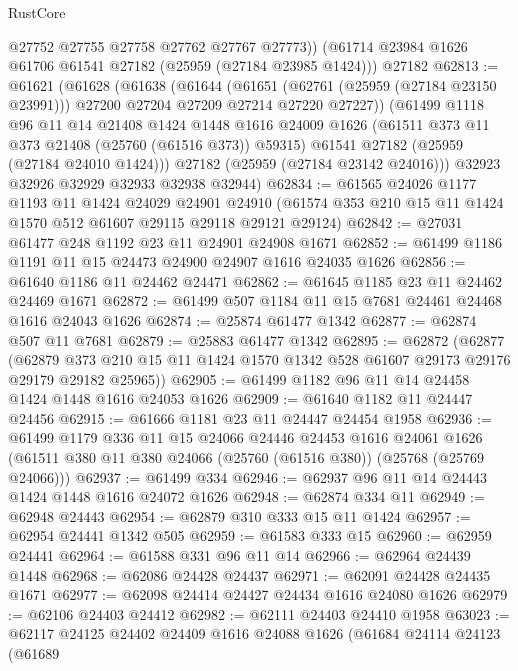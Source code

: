 \begin{lexlean}{RustCore}
\begin{coremodule}
        @27752
        @27755
        @27758
        @27762
        @27767
        @27773))
    (@61714 @23984 @1626 @61706 @61541 @27182 (@25959 (@27184 @23985 @1424)))
    @27182
@62813 := @61621
    (@61628
      (@61638
        (@61644
          (@61651
            (@62761 (@25959 (@27184 @23150 @23991)))
            @27200
            @27204
            @27209
            @27214
            @27220
            @27227))
        (@61499
          @1118
          @96
          @11
          @14
          @21408
          @1424
          @1448
          @1616
          @24009
          @1626
          (@61511 @373 @11 @373 @21408 (@25760 (@61516 @373)) @59315)
          @61541
          @27182
          (@25959 (@27184 @24010 @1424)))
        @27182
        (@25959 (@27184 @23142 @24016)))
      @32923
      @32926
      @32929
      @32933
      @32938
      @32944)
@62834 := @61565
    @24026
    @1177
    @1193
    @11
    @1424
    @24029
    @24901
    @24910
    (@61574 @353 @210 @15 @11 @1424 @1570 @512 @61607 @29115 @29118 @29121 @29124)
@62842 := @27031 @61477 @248 @1192 @23 @11 @24901 @24908 @1671
@62852 := @61499 @1186 @1191 @11 @15 @24473 @24900 @24907 @1616 @24035 @1626
@62856 := @61640 @1186 @11 @24462 @24471
@62862 := @61645 @1185 @23 @11 @24462 @24469 @1671
@62872 := @61499 @507 @1184 @11 @15 @7681 @24461 @24468 @1616 @24043 @1626
@62874 := @25874 @61477 @1342
@62877 := @62874 @507 @11 @7681
@62879 := @25883 @61477 @1342
@62895 := @62872
    (@62877
      (@62879 @373 @210 @15 @11 @1424 @1570 @1342 @528 @61607 @29173 @29176 @29179 @29182 @25965))
@62905 := @61499 @1182 @96 @11 @14 @24458 @1424 @1448 @1616 @24053 @1626
@62909 := @61640 @1182 @11 @24447 @24456
@62915 := @61666 @1181 @23 @11 @24447 @24454 @1958
@62936 := @61499
    @1179
    @336
    @11
    @15
    @24066
    @24446
    @24453
    @1616
    @24061
    @1626
    (@61511 @380 @11 @380 @24066 (@25760 (@61516 @380)) (@25768 (@25769 @24066)))
@62937 := @61499 @334
@62946 := @62937 @96 @11 @14 @24443 @1424 @1448 @1616 @24072 @1626
@62948 := @62874 @334 @11
@62949 := @62948 @24443
@62954 := @62879 @310 @333 @15 @11 @1424
@62957 := @62954 @24441 @1342 @505
@62959 := @61583 @333 @15
@62960 := @62959 @24441
@62964 := @61588 @331 @96 @11 @14
@62966 := @62964 @24439 @1448
@62968 := @62086 @24428 @24437
@62971 := @62091 @24428 @24435 @1671
@62977 := @62098 @24414 @24427 @24434 @1616 @24080 @1626
@62979 := @62106 @24403 @24412
@62982 := @62111 @24403 @24410 @1958
@63023 := @62117
    @24125
    @24402
    @24409
    @1616
    @24088
    @1626
    (@61684
      @24114
      @24123
      (@61689

\end{coremodule}
\end{lexlean}

